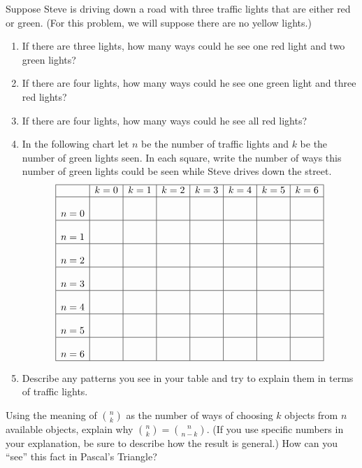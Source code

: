 \documentclass[nooutcomes,noauthor]{ximera}
\begin{document}
\begin{problem} 
Suppose Steve is driving down a road with three traffic lights that are either red or green.  (For this problem, we will suppose there are no yellow lights.)

\begin{enumerate}
\item If there are three lights, how many ways could he see one red light and two green lights?
\item If there are four lights, how many ways could he see one green light and three red lights?  
\item If there are four lights, how many ways could he see all red lights?  

 \item In the following chart let $n$ be the number of traffic lights and $k$ be  the number of green lights seen. In each square, write the number of ways this number of green lights could be seen while Steve drives down the street.
\[
\begin{array}{|c|c|c|c|c|c|c|c|}
    \hline
          & k=0 & k=1 & k=2 & k=3 & k=4 & k=5 & k = 6\\
    \hline
    n=0 &\rule[0mm]{0mm}{7mm}&       &       &       &       &   &   \\
    \hline
    n=1 &\rule[0mm]{0mm}{7mm}  &       &       &       &       &   &   \\
    \hline
    n=2 & \rule[0mm]{0mm}{7mm} &     &     &       &       &    &  \\
    \hline
    n=3 &\rule[0mm]{0mm}{7mm}       &       &       &       &       &   &   \\
    \hline
    n=4 & \rule[0mm]{0mm}{7mm}      &       &       &       &       &   &   \\
    \hline
    n=5 &\rule[0mm]{0mm}{7mm}       &       &       &       &       &   &   \\
    \hline
    n=6 &\rule[0mm]{0mm}{7mm}       &       &       &       &       &   &   \\
    \hline
\end{array}
\]
\item Describe any patterns you see in your table and try to explain them in terms of traffic lights.
\end{enumerate}

\end{problem}

\begin{problem}
Using the meaning of $\binom{n}{k}$ as the number of ways of choosing $k$ objects from $n$ available objects, explain why $\binom{n}{k} = \binom{n}{n-k}$.  (If you use specific numbers in your explanation, be sure to describe how the result is general.)  How can you ``see'' this fact in Pascal's Triangle?  
\end{problem}
\end{document}
